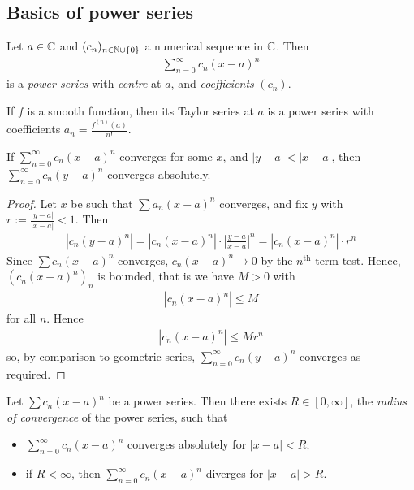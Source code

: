 \documentclass{../../template/note}
\begin{document}
    \subsection{Basics of power series}

    \begin{definition}
        Let \(a \in \mathbb C\) and \((c_n)_{n \in \mathbb N \cup \{0\}}\) a numerical sequence in \(\mathbb C\). Then
        \begin{align*}
            \sum_{n=0}^\infty c_n(x-a)^n
        \end{align*}
        is a \emph{power series} with \emph{centre} at \(a\), and \emph{coefficients} \((c_n)\).
    \end{definition}
    
    \begin{example*}
        If \(f\) is a smooth function, then its Taylor series at \(a\) is a power series with coefficients \(a_n = \frac{f^{(n)}(a)}{n!}\).
    \end{example*}
    
    \begin{lemma}
        \label{rad-conv-lemma}
        If \(\sum_{n=0}^\infty c_n (x-a)^n\) converges for some \(x\), and \(|y-a| < |x-a|\), then \(\sum_{n=0}^\infty c_n (y-a)^n\) converges absolutely.
    \end{lemma}
    
    \begin{proof}
        Let \(x\) be such that \(\sum a_n(x-a)^n\) converges, and fix \(y\) with \(r := \frac{|y-a|}{|x-a|} < 1\). Then
        \begin{align*}
            \left|c_n(y-a)^n\right| = \left|c_n(x-a)^n\right| \cdot \left|\frac{y-a}{x-a}\right|^n = \left|c_n(x-a)^n\right|\cdot r^n
        \end{align*}
        Since \(\sum c_n(x-a)^n\) converges, \(c_n(x-a)^n \to 0\) by the \(n^\text{th}\) term test. Hence, \((c_n(x-a)^n)_n\) is bounded, that is we have \(M > 0\) with
        \begin{align*}
            |c_n(x-a)^n| \leq M
        \end{align*}
        for all \(n\). Hence
        \begin{align*}
            |c_n(x-a)^n| \leq Mr^n
        \end{align*}
        so, by comparison to geometric series, \(\sum_{n=0}^\infty c_n(y-a)^n\) converges as required.
    \end{proof}
    
    \begin{proposition}
        Let \(\sum c_n(x-a)^n\) be a power series. Then there exists \(R \in [0, \infty]\), the \emph{radius of convergence} of the power series, such that
        \begin{itemize}
            \item \(\sum_{n=0}^\infty c_n(x-a)^n\) converges absolutely for \(|x-a| < R\);
            \item if \(R < \infty\), then \(\sum_{n=0}^\infty c_n(x-a)^n\) diverges for \(|x-a| > R\).
        \end{itemize}       
    \end{proposition}
\end{document}
